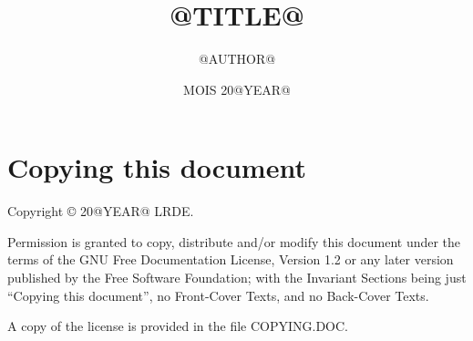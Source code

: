 \documentclass{techrep} %
\title{@TITLE@}
\author{@AUTHOR@}
\date{MOIS 20@YEAR@}
\begin{document}
\section*{Copying this document}
Copyright \copyright{} 20@YEAR@ LRDE.

Permission is granted to copy, distribute and/or modify this document under
the terms of the GNU Free Documentation License, Version 1.2 or any later
version published by the Free Software Foundation; with the Invariant Sections
being just ``Copying this document'', no Front-Cover Texts, and no Back-Cover
Texts.

A copy of the license is provided in the file COPYING.DOC.

\tableofcontents
\end{document}
